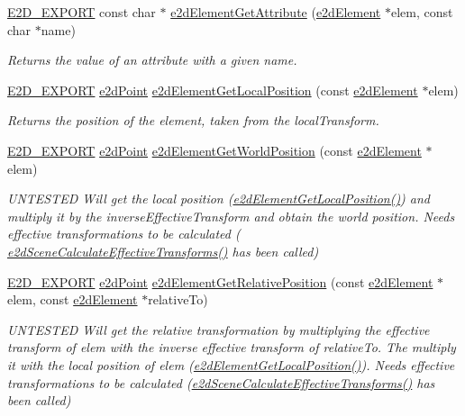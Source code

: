 \begin{DoxyCompactItemize}
\hyperlink{Ez2DS_8h_a9f14e9cb869e1a85fdaba03afcca0df9}{E2\-D\-\_\-\-E\-X\-P\-O\-R\-T} const char $\ast$ \hyperlink{group__e2dElement_ga7ed2b8668a43316418c8da8b9248a1af}{e2d\-Element\-Get\-Attribute} (\hyperlink{structe2dElement}{e2d\-Element} $\ast$elem, const char $\ast$name)
\begin{DoxyCompactList}\small\item\em Returns the value of an attribute with a given name. \end{DoxyCompactList}\item 
\hyperlink{Ez2DS_8h_a9f14e9cb869e1a85fdaba03afcca0df9}{E2\-D\-\_\-\-E\-X\-P\-O\-R\-T} \hyperlink{structe2dPoint}{e2d\-Point} \hyperlink{group__e2dElement_ga9e3e35d789556a05a4bd439b8cae01f2}{e2d\-Element\-Get\-Local\-Position} (const \hyperlink{structe2dElement}{e2d\-Element} $\ast$elem)
\begin{DoxyCompactList}\small\item\em Returns the position of the element, taken from the local\-Transform. \end{DoxyCompactList}\item 
\hyperlink{Ez2DS_8h_a9f14e9cb869e1a85fdaba03afcca0df9}{E2\-D\-\_\-\-E\-X\-P\-O\-R\-T} \hyperlink{structe2dPoint}{e2d\-Point} \hyperlink{group__e2dElement_ga542b7ae5370bd59e118ed656588d3029}{e2d\-Element\-Get\-World\-Position} (const \hyperlink{structe2dElement}{e2d\-Element} $\ast$elem)
\begin{DoxyCompactList}\small\item\em U\-N\-T\-E\-S\-T\-E\-D Will get the local position (\hyperlink{group__e2dElement_ga9e3e35d789556a05a4bd439b8cae01f2}{e2d\-Element\-Get\-Local\-Position()}) and multiply it by the inverse\-Effective\-Transform and obtain the world position. Needs effective transformations to be calculated ( \hyperlink{group__e2dScene_ga6981f2448904c96723449cb84ffb4d8a}{e2d\-Scene\-Calculate\-Effective\-Transforms()} has been called) \end{DoxyCompactList}\item 
\hyperlink{Ez2DS_8h_a9f14e9cb869e1a85fdaba03afcca0df9}{E2\-D\-\_\-\-E\-X\-P\-O\-R\-T} \hyperlink{structe2dPoint}{e2d\-Point} \hyperlink{group__e2dElement_gaa00ae93ed9fb9d27db2513e3f05a0827}{e2d\-Element\-Get\-Relative\-Position} (const \hyperlink{structe2dElement}{e2d\-Element} $\ast$elem, const \hyperlink{structe2dElement}{e2d\-Element} $\ast$relative\-To)
\begin{DoxyCompactList}\small\item\em U\-N\-T\-E\-S\-T\-E\-D Will get the relative transformation by multiplying the effective transform of elem with the inverse effective transform of relative\-To. The multiply it with the local position of elem (\hyperlink{group__e2dElement_ga9e3e35d789556a05a4bd439b8cae01f2}{e2d\-Element\-Get\-Local\-Position()}). Needs effective transformations to be calculated (\hyperlink{group__e2dScene_ga6981f2448904c96723449cb84ffb4d8a}{e2d\-Scene\-Calculate\-Effective\-Transforms()} has been called) \end{DoxyCompactList}\item 

\end{DoxyCompactItemize}
